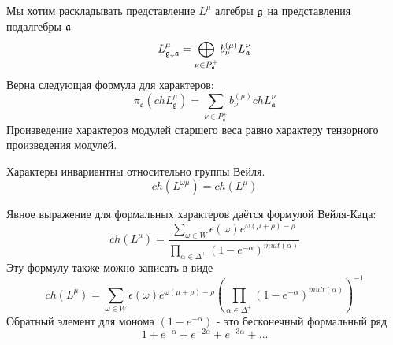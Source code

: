 \documentclass[a4paper,12pt]{article}
\theoremstyle{definition} \newtheorem{Def}{Definition}
\begin{document}
Мы хотим раскладывать представление $L^{\mu}$ алгебры
$\frak{g}$ на представления подалгебры $\frak{a}$
\begin{equation}
  \label{eq:1}
  L_{\frak{g}\downarrow \frak{a}}^{\mu }=\bigoplus\limits_{\nu \in P_{\frak{a}%
    }^{+}}b_{\nu }^{\left( \mu \right) }L_{\frak{a}}^{\nu }
\end{equation}
Верна следующая формула для характеров:
\begin{equation}
  \label{eq:2}
  \pi_{\mathfrak{a}}(ch L^{\mu}_{\mathfrak{g}})=\sum_{\nu\in P^{+}_{\mathfrak{a}}}b^{(\mu)}_{\nu} ch L^{\nu}_{\mathfrak{a}}
\end{equation}
Произведение характеров модулей старшего веса равно характеру тензорного произведения модулей.

Характеры инвариантны относительно группы Вейля.
\begin{equation}
  \label{eq:3}
  ch(L^{\omega\mu})=ch(L^{\mu})
\end{equation}

Явное выражение для формальных характеров даётся формулой Вейля-Каца:
\begin{equation}
  \label{eq:4}
  ch(L^{\mu})=\frac{\sum_{\omega\in W}\epsilon(\omega)e^{\omega(\mu+\rho)-\rho}}{\prod_{\alpha\in \Delta^{+}}(1-e^{-\alpha})^{mult(\alpha)}}
\end{equation}
Эту формулу также можно записать в виде
\begin{equation}
  \label{eq:5}
  ch(L^{\mu})=\sum_{\omega\in W}\epsilon(\omega)e^{\omega(\mu+\rho)-\rho} \left(\prod_{\alpha\in \Delta^{+}}(1-e^{-\alpha})^{mult(\alpha)}\right)^{-1}
\end{equation}
Обратный элемент для монома $(1-e^{-\alpha})$ - это бесконечный формальный ряд
\begin{equation}
  \label{eq:6}
  1+e^{-\alpha}+e^{-2\alpha}+e^{-3\alpha}+\dots
\end{equation}
\end{document}
